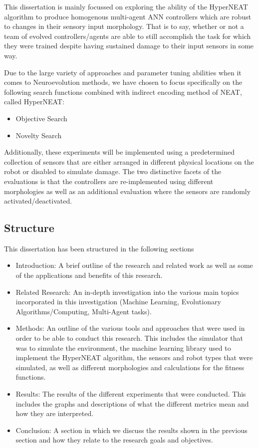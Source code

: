 This dissertation is mainly focussed on exploring the ability of the HyperNEAT algorithm to produce homogenous multi-agent ANN controllers which are robust to changes in their sensory input morphology. That is to say, whether or not a team of evolved controllers/agents are able to still accomplish the task for which they were trained despite having sustained damage to their input sensors in some way.

Due to the large variety of approaches and parameter tuning abilities when it comes to Neuroevolution methods, we have chosen to focus specifically on the following search functions combined with indirect encoding method of NEAT, called HyperNEAT:
\begin{itemize}
	\item Objective Search
	\item Novelty Search
\end{itemize}

Additionally, these experiments will be implemented using a predetermined collection of sensors that are either arranged in different physical locations on the robot or disabled to simulate damage.  The two distinctive facets of the evaluations is that the controllers are re-implemented using different morphologies as well as an additional evaluation where the sensors are randomly activated/deactivated.

\subsection{Structure}
This dissertation has been structured in the following sections
\begin{itemize}
	\item Introduction: A brief outline of the research and related work as well as some of the applications and benefits of this research.
	\item Related Research: An in-depth investigation into the various main topics incorporated in this investigation (Machine Learning, Evolutionary Algorithms/Computing, Multi-Agent tasks).
	\item Methods: An outline of the various tools and approaches that were used in order to be able to conduct this research. This includes the simulator that was to simulate the environment, the machine learning library used to implement the HyperNEAT algorithm, the sensors and robot types that were simulated, as well as different morphologies and calculations for the fitness functions.
	\item Results: The results of the different experiments that were conducted. This includes the graphs and descriptions of what the different metrics mean and how they are interpreted.
	\item Conclusion: A section in which we discuss the results shown in the previous section and how they relate to the research goals and objectives.
\end{itemize}



